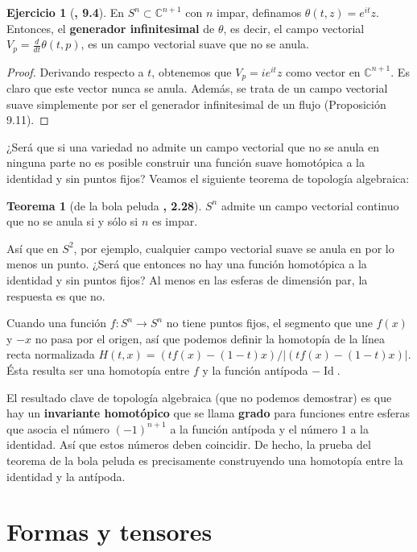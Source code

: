 \documentclass[spanish]{book}
\theoremstyle{definition}
\newtheorem*{teo}{Teorema}
\newtheorem*{ejer*}{Ejercicio}
\newcommand{\C}{\mathbb{C}}
\DeclareMathOperator{\Id}{Id}
\begin{document}
	\begin{ejer*}[\cite{Lee}\textbf{, 9.4}]
		En $S^n\subset\C^{n+1}$ con $n$ impar, definamos $\theta(t,z)=e^{it}z$. Entonces, el \textbf{generador infinitesimal} de $\theta$, es decir, el campo vectorial $V_p=\frac{d}{dt}\theta(t,p)$, es un campo vectorial suave que no se anula.
	\end{ejer*}
	\begin{proof}
		Derivando respecto a $t$, obtenemos que $V_p=ie^{it}z$ como vector en $\C^{n+1}$. Es claro que este vector nunca se anula. Además, se trata de un campo vectorial suave simplemente por ser el generador infinitesimal de un flujo (Proposición 9.11).
	\end{proof}
	
	¿Será que si una variedad no admite un campo vectorial que no se anula en ninguna parte no es posible construir una función suave homotópica a la identidad y sin puntos fijos? Veamos el siguiente teorema de topología algebraica:
	\begin{teo}[de la bola peluda \cite{Hatcher}\textbf{, 2.28}]\label{teo:bola-peluda}
		$S^n$ admite un campo vectorial continuo que no se anula si y sólo si $n$ es impar.
	\end{teo}
	Así que en $S^2$, por ejemplo, cualquier campo vectorial suave se anula en por lo menos un punto. ¿Será que entonces no hay una función homotópica a la identidad y sin puntos fijos? Al menos en las esferas de dimensión par, la respuesta es que no.
	
	Cuando una función ${f:S^n\to S^n}$ no tiene puntos fijos, el segmento que une $f(x)$ y $-x$ no pasa por el origen, así que podemos definir la homotopía de la línea recta normalizada $H(t,x)=(tf(x)-(1-t)x)/|(tf(x)-(1-t)x)|$. Ésta resulta ser una homotopía entre $f$ y la función antípoda $-\Id$.
	
	El resultado clave de topología algebraica (que no podemos demostrar) es que hay un \textbf{invariante homotópico} que se llama \textbf{grado} para funciones entre esferas que asocia el número $(-1)^{n+1}$ a la función antípoda y el número $1$ a la identidad. Así que estos números deben coincidir. De hecho, la prueba del teorema de la bola peluda es precisamente construyendo una homotopía entre la identidad y la antípoda.
	
	\chapter{Formas y tensores}
\end{document}
